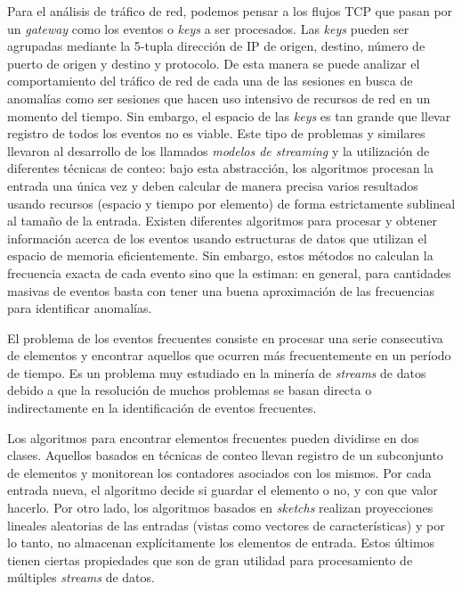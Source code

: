 \documentclass[a4paper,10pt, oneside]{article}
\begin{document}
Para el análisis de tráfico de red, podemos pensar a los flujos TCP que pasan por un \textit{gateway} como los eventos o \textit{keys} a ser procesados. Las \textit{keys} pueden ser agrupadas mediante la 5-tupla dirección de IP de origen, destino, número de puerto de origen y destino y protocolo. De esta manera se puede analizar el comportamiento del tráfico de red de cada una de las sesiones en busca de anomalías como ser sesiones que hacen uso intensivo de recursos de red en un momento del tiempo. Sin embargo, el espacio de las \textit{keys} es tan grande que llevar registro de todos los eventos no es viable. Este tipo de problemas y similares llevaron al desarrollo de los llamados \textit{modelos de streaming} y la utilización de diferentes técnicas de conteo: bajo esta abstracción, los algoritmos procesan la entrada una única vez y deben calcular de manera precisa varios resultados usando recursos (espacio y tiempo por elemento) de forma estrictamente sublineal al tamaño de la entrada\cite{Muthukrishnan:2005:DSA:1166409.1166410}. Existen diferentes algoritmos para procesar y obtener información acerca de los eventos usando estructuras de datos que utilizan el espacio de memoria eficientemente. Sin embargo, estos métodos no calculan la frecuencia exacta de cada evento sino que la estiman: en general, para cantidades masivas de eventos basta con tener una buena aproximación de las frecuencias para identificar anomalías.

El problema de los eventos frecuentes consiste en procesar una serie consecutiva de elementos y encontrar aquellos que ocurren más frecuentemente en un período de tiempo. Es un problema muy estudiado en la minería de \textit{streams} de datos debido a que la resolución de muchos problemas se basan directa o indirectamente en la identificación de eventos frecuentes.

Los algoritmos para encontrar elementos frecuentes pueden dividirse en dos clases. Aquellos basados en técnicas de conteo llevan registro de un subconjunto de elementos y monitorean los contadores asociados con los mismos. Por cada entrada nueva, el algoritmo decide si guardar el elemento o no, y con que valor hacerlo. Por otro lado, los algoritmos basados en \textit{sketchs} realizan proyecciones lineales aleatorias de las entradas\cite{Cormode:2008:FFI:1454159.1454225} (vistas como vectores de características) y por lo tanto, no almacenan explícitamente los elementos de entrada. Estos últimos tienen ciertas propiedades que son de gran utilidad para procesamiento de múltiples \textit{streams} de datos.
\end{document}
